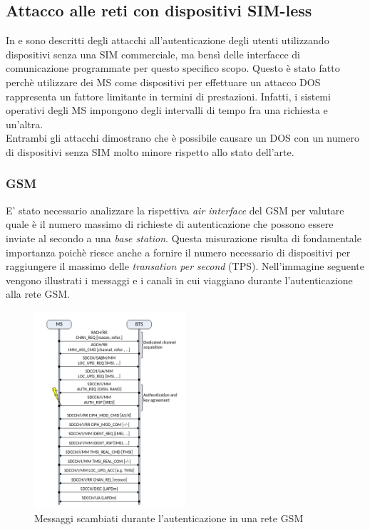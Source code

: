 \clearpage

\subsection{Attacco alle reti con dispositivi SIM-less}
In \cite{umts-dos} e \cite{gsm-dos-simless} sono descritti degli attacchi all'autenticazione degli utenti utilizzando dispositivi senza una SIM commerciale, ma bensì delle interfacce di comunicazione 
programmate per questo specifico scopo. Questo è stato fatto perchè utilizzare dei MS come dispositivi per effettuare un attacco DOS rappresenta un fattore limitante in termini di prestazioni. Infatti, 
i sistemi operativi degli MS impongono degli intervalli di tempo fra una richiesta e un'altra.\\
Entrambi gli attacchi dimostrano che è possibile causare un DOS con un numero di dispositivi senza SIM molto minore rispetto allo stato dell'arte. 
\subsubsection{GSM}
E' stato necessario analizzare la rispettiva \textit{air interface} del GSM per valutare quale è il numero massimo di richieste di autenticazione 
che possono essere inviate al secondo a una \textit{base station}. Questa misurazione risulta di fondamentale importanza poichè riesce anche a fornire il numero necessario 
di dispositivi per raggiungere il massimo delle \textit{transation per second} (TPS).
Nell'immagine seguente vengono illustrati i messaggi e i canali in cui viaggiano durante l'autenticazione alla rete GSM.
\begin{figure}[h]
    \centering
    \includegraphics[width=0.5\textwidth]{images/gsm-air-channel.png}
    \caption{Messaggi scambiati durante l'autenticazione in una rete GSM\cite{gsm-dos-simless}}
\end{figure}

